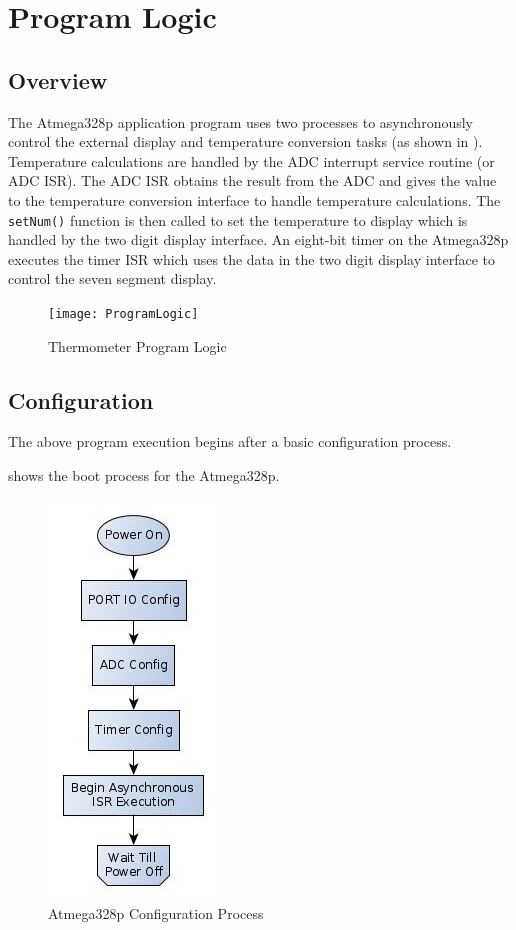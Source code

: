 \documentclass[main.tex]{subfiles}
\begin{document}
\chapter{Program Logic} 
	\section{Overview}
	The Atmega328p application program uses two processes to asynchronously
	control the external display and temperature conversion tasks (as shown in
	). Temperature calculations are handled by the ADC interrupt
	service routine (or ADC ISR). The ADC ISR obtains the result from the ADC and
	gives the value to the temperature conversion interface to handle temperature
	calculations.  The \lstinline{setNum()} function is then called to set the
	temperature to display which is handled by the two digit display interface. An
	eight-bit timer on the Atmega328p executes the timer ISR which uses the data
	in the two digit display interface to control the seven segment display.

	\begin{figure}[H]
		\begin{center}
			\texttt{[image: ProgramLogic]}
		\end{center}
		\caption{Thermometer Program Logic}
		\label{fig:progLogic}
	\end{figure}

	\section{Configuration}
	The above program execution begins after a basic configuration process.

	 shows the boot process for the Atmega328p. 
	\begin{figure}[H]
		\begin{center}
			\includegraphics[width=0.3\linewidth]{figures/progBoot}
		\end{center}
		\caption{Atmega328p Configuration Process}
		\label{fig:progBoot}
	\end{figure}
\end{document}

